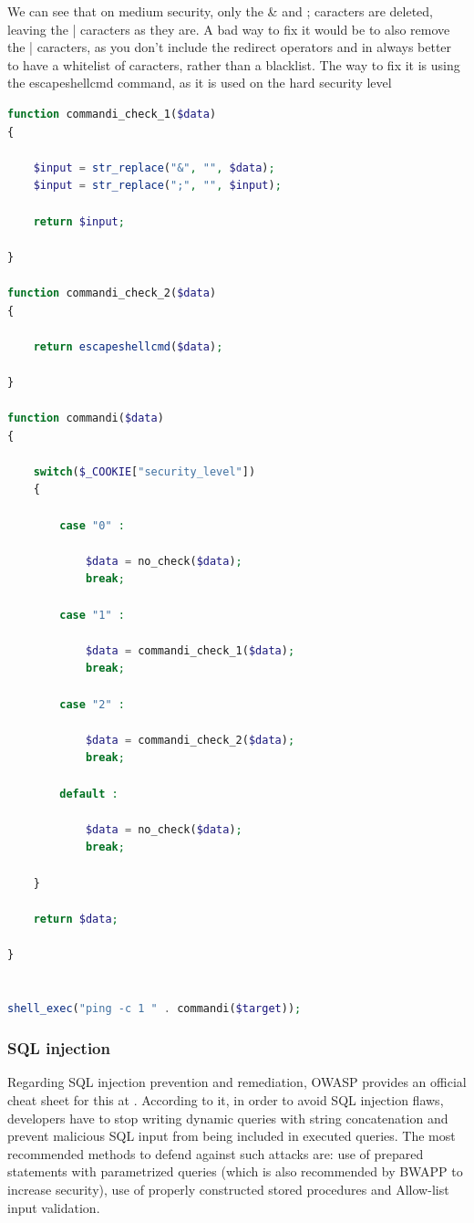 \documentclass{article}
\begin{document}
We can see that on medium security, only the \& and ; caracters are deleted, leaving the | caracters as they are.
A bad way to fix it would be to also remove the | caracters, as you don't include the redirect operators and in always better to have a whitelist of caracters, rather than a blacklist.
The way to fix it is using the escapeshellcmd command, as it is used on the hard security level
\begin{lstlisting}[language=php,caption={Backdoor Code},label=php:command-injection-code]
function commandi_check_1($data)
{
    
    $input = str_replace("&", "", $data);
    $input = str_replace(";", "", $input);
    
    return $input;
    
}

function commandi_check_2($data)
{
   
    return escapeshellcmd($data);
    
}

function commandi($data)
{

    switch($_COOKIE["security_level"])
    {

        case "0" :

            $data = no_check($data);
            break;

        case "1" :

            $data = commandi_check_1($data);
            break;

        case "2" :

            $data = commandi_check_2($data);
            break;

        default :

            $data = no_check($data);
            break;

    }

    return $data;

}


shell_exec("ping -c 1 " . commandi($target));
\end{lstlisting}

\subsubsection{SQL injection}
Regarding SQL injection prevention and remediation, OWASP provides an official cheat sheet for this at \cite{owasp-sqli-cheat-sheet}.
According to it, in order to avoid SQL injection flaws, developers have to stop writing dynamic queries with string concatenation and prevent malicious SQL input from being included in executed queries.
The most recommended methods to defend against such attacks are: use of prepared statements with parametrized queries (which is also recommended by BWAPP to increase security), use of properly constructed stored procedures and Allow-list input validation.
\end{document}
